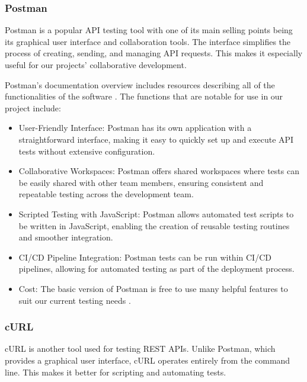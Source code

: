 \documentclass[12pt,titlepage]{article}
\begin{document}
\subsubsection{Postman}
Postman is a popular API testing tool with one of its main selling points being its graphical user interface and collaboration tools. The interface simplifies the process of creating, sending, and managing API requests. This makes it especially useful for our projects’ collaborative development.

Postman's documentation overview includes resources describing all of the functionalities of the software \cite{postman-overview}. The functions that are notable for use in our project include:
\begin{itemize}
\item User-Friendly Interface: Postman has its own application with a straightforward interface, making it easy to quickly set up and execute API tests without extensive configuration.
\item Collaborative Workspaces: Postman offers shared workspaces where tests can be easily shared with other team members, ensuring consistent and repeatable testing across the development team.
\item Scripted Testing with JavaScript: Postman allows automated test scripts to be written in JavaScript, enabling the creation of reusable testing routines and smoother integration.
\item CI/CD Pipeline Integration: Postman tests can be run within CI/CD pipelines, allowing for automated testing as part of the deployment process.
\item Cost: The basic version of Postman is free to use many helpful features to suit our current testing needs \cite{postman-pricing}.
\end{itemize}

\subsubsection{cURL}
cURL is another tool used for testing REST APIs. Unlike Postman, which provides a graphical user interface, cURL operates entirely from the command line. This makes it better for scripting and automating tests.
\end{document}
